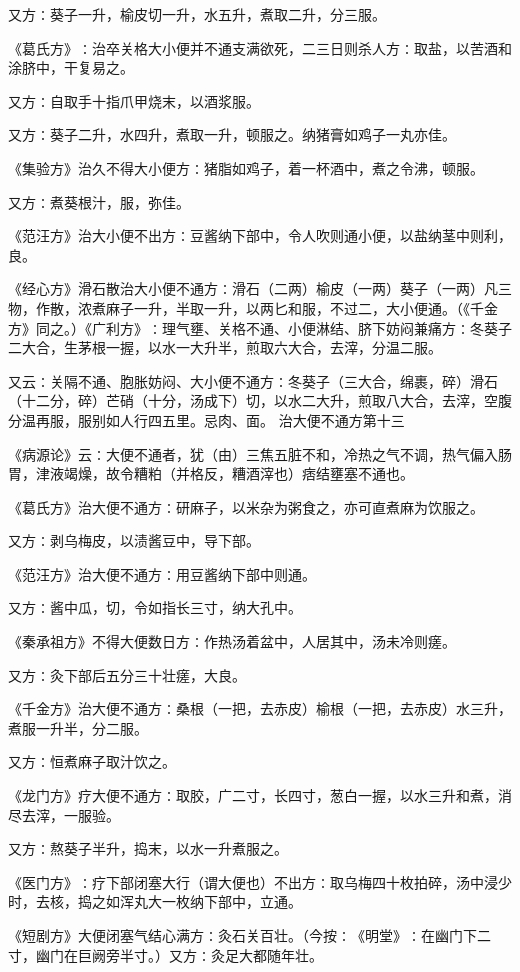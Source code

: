 \documentclass[a4paper,12pt,UTF8,twoside]{ctexbook}
\begin{document}
又方∶葵子一升，榆皮切一升，水五升，煮取二升，分三服。

《葛氏方》∶治卒关格大小便并不通支满欲死，二三日则杀人方∶取盐，以苦酒和涂脐中，干复易之。

又方∶自取手十指爪甲烧末，以酒浆服。

又方∶葵子二升，水四升，煮取一升，顿服之。纳猪膏如鸡子一丸亦佳。

《集验方》治久不得大小便方∶猪脂如鸡子，着一杯酒中，煮之令沸，顿服。

又方∶煮葵根汁，服，弥佳。

《范汪方》治大小便不出方∶豆酱纳下部中，令人吹则通小便，以盐纳茎中则利，良。

《经心方》滑石散治大小便不通方∶滑石（二两）榆皮（一两）葵子（一两）凡三物，作散，浓煮麻子一升，半取一升，以两匕和服，不过二，大小便通。（《千金方》同之。）《广利方》∶理气壅、关格不通、小便淋结、脐下妨闷兼痛方∶冬葵子二大合，生茅根一握，以水一大升半，煎取六大合，去滓，分温二服。

又云∶关隔不通、胞胀妨闷、大小便不通方∶冬葵子（三大合，绵裹，碎）滑石（十二分，碎）芒硝（十分，汤成下）切，以水二大升，煎取八大合，去滓，空腹分温再服，服别如人行四五里。忌肉、面。
治大便不通方第十三

《病源论》云∶大便不通者，犹（由）三焦五脏不和，冷热之气不调，热气偏入肠胃，津液竭燥，故令糟粕（并格反，糟酒滓也）痞结壅塞不通也。

《葛氏方》治大便不通方∶研麻子，以米杂为粥食之，亦可直煮麻为饮服之。

又方∶剥乌梅皮，以渍酱豆中，导下部。

《范汪方》治大便不通方∶用豆酱纳下部中则通。

又方∶酱中瓜，切，令如指长三寸，纳大孔中。

《秦承祖方》不得大便数日方∶作热汤着盆中，人居其中，汤未冷则瘥。

又方∶灸下部后五分三十壮瘥，大良。

《千金方》治大便不通方∶桑根（一把，去赤皮）榆根（一把，去赤皮）水三升，煮服一升半，分二服。

又方∶恒煮麻子取汁饮之。

《龙门方》疗大便不通方∶取胶，广二寸，长四寸，葱白一握，以水三升和煮，消尽去滓，一服验。

又方∶熬葵子半升，捣末，以水一升煮服之。

《医门方》∶疗下部闭塞大行（谓大便也）不出方∶取乌梅四十枚拍碎，汤中浸少时，去核，捣之如浑丸大一枚纳下部中，立通。

《短剧方》大便闭塞气结心满方∶灸石关百壮。（今按∶《明堂》∶在幽门下二寸，幽门在巨阙旁半寸。）又方∶灸足大都随年壮。
\end{document}
